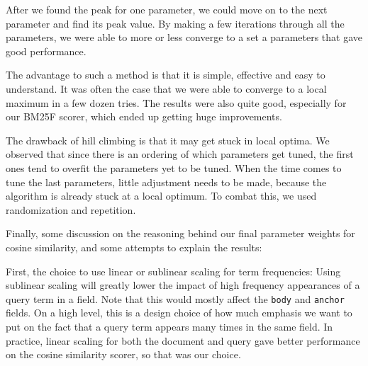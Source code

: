 \documentclass[10pt,twocolumn]{article}
\begin{document}
After we found the peak for one parameter, we could move on to the next parameter and find its peak value. By making a few iterations through all the parameters, we were able to more or less converge to a set a parameters that gave good performance.

The advantage to such a method is that it is simple, effective and easy to understand. It was often the case that we were able to converge to a local maximum in a few dozen tries. The results were also quite good, especially for our BM25F scorer, which ended up getting huge improvements.

The drawback of hill climbing is that it may get stuck in local optima. We observed that since there is an ordering of which parameters get tuned, the first ones tend to overfit the parameters yet to be tuned. When the time comes to tune the last parameters, little adjustment needs to be made, because the algorithm is already stuck at a local optimum. To combat this, we used randomization and repetition.

Finally, some discussion on the reasoning behind our final parameter weights for cosine similarity, and some attempts to explain the results:

First, the choice to use linear or sublinear scaling for term frequencies: Using sublinear scaling will greatly lower the impact of high frequency appearances of a query term in a field. Note that this would mostly affect the \texttt{body} and \texttt{anchor} fields. On a high level, this is a design choice of how much emphasis we want to put on the fact that a query term appears many times in the same field. In practice, linear scaling for both the document and query gave better performance on the cosine similarity scorer, so that was our choice.
\end{document}
